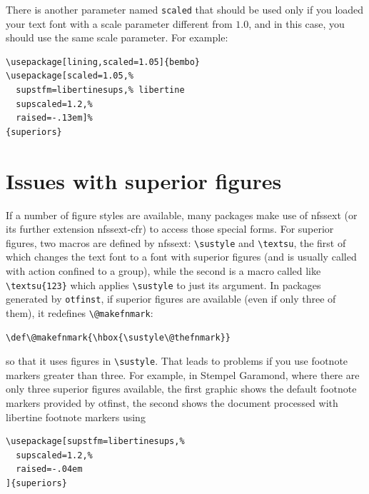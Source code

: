 \documentclass[11pt]{amsart}
\begin{document}
There is another parameter named {\tt scaled} that should be used only if you loaded your text font with a scale parameter different from $1.0$, and in this case, you should use the same scale parameter. For example:
\begin{verbatim}
\usepackage[lining,scaled=1.05]{bembo}
\usepackage[scaled=1.05,%
  supstfm=libertinesups,% libertine
  supscaled=1.2,%
  raised=-.13em]%
{superiors}
\end{verbatim}
\section{Issues with superior figures}
If a number of figure styles are available, many packages make use of \textsf{nfssext} (or its further extension \textsf{nfssext-cfr}) to access those special forms. For superior figures, two macros are defined by \textsf{nfssext}: \verb|\sustyle| and \verb|\textsu|, the first of which changes the text font to a font with superior figures (and is usually called with action confined to a group), while the second is a macro called like \verb|\textsu{123}| which applies \verb|\sustyle| to just its argument. In packages generated by {\tt otfinst}, if superior figures are available (even if only three of them), it redefines \verb|\@makefnmark|:
\begin{verbatim}
\def\@makefnmark{\hbox{\sustyle\@thefnmark}}
\end{verbatim}
so that it uses figures in \verb|\sustyle|. That leads to problems if you use footnote markers greater than three. For example, in Stempel Garamond, where there are only three superior figures available, the first graphic shows the default footnote markers provided by \textsf{otfinst}, the second shows the document processed with libertine footnote markers using 
\begin{verbatim}
\usepackage[supstfm=libertinesups,%
  supscaled=1.2,%
  raised=-.04em
]{superiors}
\end{verbatim}
\end{document}
